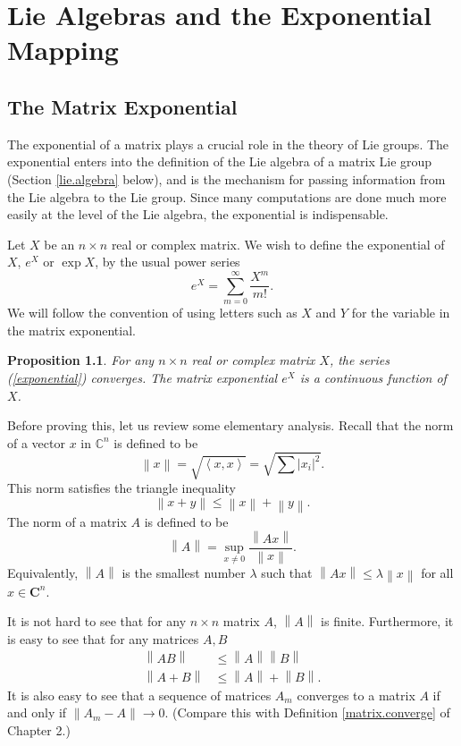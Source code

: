 \documentclass[12pt]{amsbook}
\theoremstyle{plain}
\newtheorem{proposition}[theorem]{Proposition}
\numberwithin{equation}{chapter}
\numberwithin{theorem}{chapter}
\begin{document}
\chapter{Lie Algebras and the Exponential Mapping}

\section{The Matrix Exponential}

The exponential of a matrix plays a crucial role in the theory of Lie groups.
The exponential enters into the definition of the Lie algebra of a matrix Lie
group (Section \ref{lie.algebra} below), and is the mechanism for passing
information from the Lie algebra to the Lie group. Since many computations are
done much more easily at the level of the Lie algebra, the exponential is indispensable.

Let $X$ be an $n\times n$ real or complex matrix. We wish to define the
exponential of $X$, $e^{X}$ or $\exp X$, by the usual power series
\begin{equation}
e^{X}=\sum_{m=0}^{\infty}\frac{X^{m}}{m!}\text{.}\label{exponential}%
\end{equation}
We will follow the convention of using letters such as $X$ and $Y$ for the
variable in the matrix exponential.

\begin{proposition}
\label{convergence}For any $n\times n$ real or complex matrix $X$, the series
(\ref{exponential}) converges. The matrix exponential $e^{X}$ is a continuous
function of $X$.
\end{proposition}

Before proving this, let us review some elementary analysis. Recall that the
norm of a vector $x$ in $\mathbb{C}^{n}$ is defined to be
\[
\left\|  x\right\|  =\sqrt{\left\langle x,x\right\rangle }=\sqrt{\sum\left|
x_{i}\right|  ^{2}}\text{.}%
\]
This norm satisfies the triangle inequality
\[
\left\|  x+y\right\|  \leq\left\|  x\right\|  +\left\|  y\right\|  \text{.}%
\]
The norm of a matrix $A$ is defined to be
\[
\left\|  A\right\|  =\sup_{x\neq0}\frac{\left\|  Ax\right\|  }{\left\|
x\right\|  }\text{.}%
\]
Equivalently, $\left\|  A\right\|  $ is the smallest number $\lambda$ such
that $\left\|  Ax\right\|  \leq\lambda\left\|  x\right\|  $ for all
$x\in\mathbf{C}^{n}$.

It is not hard to see that for any $n\times n$ matrix $A$, $\left\|
A\right\|  $ is finite. Furthermore, it is easy to see that for any matrices
$A,B$%
\begin{align}
\left\|  AB\right\|   & \leq\left\|  A\right\|  \left\|  B\right\|
\label{banach}\\
\left\|  A+B\right\|   & \leq\left\|  A\right\|  +\left\|  B\right\|  \text{.}%
\end{align}
It is also easy to see that a sequence of matrices $A_{m}$ converges to a
matrix $A$ if and only if $\left\|  A_{m}-A\right\|  \rightarrow0$. (Compare
this with Definition \ref{matrix.converge} of Chapter 2.)
\end{document}
